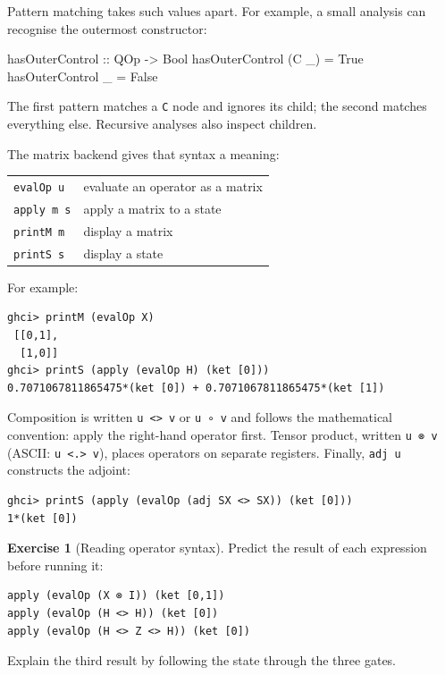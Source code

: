 \documentclass[11pt,a4paper]{article}
\theoremstyle{definition}
\newtheorem{exercise}{Exercise}[section]
\begin{document}
Pattern matching takes such values apart.  For example, a small analysis can
recognise the outermost constructor:
\begin{qppcode}
hasOuterControl :: QOp -> Bool
hasOuterControl (C _) = True
hasOuterControl _     = False
\end{qppcode}
The first pattern matches a \lstinline|C| node and ignores its child; the
second matches everything else.  Recursive analyses also inspect children.

The matrix backend gives that syntax a meaning:
\begin{center}
\begin{tabular}{ll}
\lstinline|evalOp u| & evaluate an operator as a matrix \\
\lstinline|apply m s| & apply a matrix to a state \\
\lstinline|printM m| & display a matrix \\
\lstinline|printS s| & display a state
\end{tabular}
\end{center}
For example:
\begin{lstlisting}
ghci> printM (evalOp X)
 [[0,1],
  [1,0]]
ghci> printS (apply (evalOp H) (ket [0]))
0.7071067811865475*(ket [0]) + 0.7071067811865475*(ket [1])
\end{lstlisting}

Composition is written \lstinline|u <> v| or \lstinline|u ∘ v| and follows
the mathematical convention: apply the right-hand operator first.  Tensor
product, written \lstinline|u ⊗ v| (ASCII: \lstinline|u <.> v|), places
operators on separate registers.  Finally, \lstinline|adj u| constructs the
adjoint:
\begin{lstlisting}
ghci> printS (apply (evalOp (adj SX <> SX)) (ket [0]))
1*(ket [0])
\end{lstlisting}

\begin{exercise}[Reading operator syntax]
Predict the result of each expression before running it:
\begin{lstlisting}
apply (evalOp (X ⊗ I)) (ket [0,1])
apply (evalOp (H <> H)) (ket [0])
apply (evalOp (H <> Z <> H)) (ket [0])
\end{lstlisting}
Explain the third result by following the state through the three gates.
\end{exercise}
\end{document}
